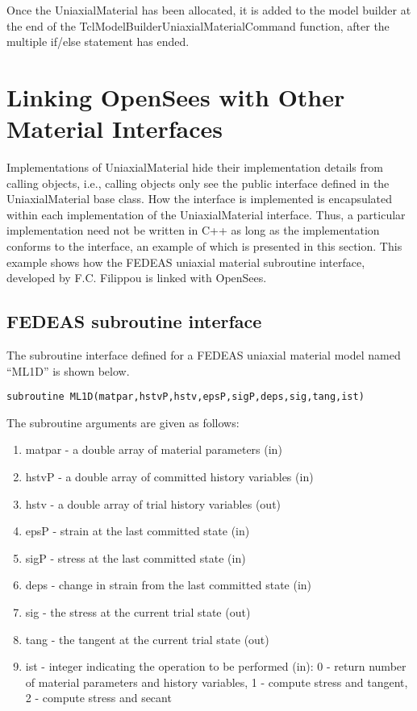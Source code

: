 \documentclass[12pt]{article}
\begin{document}
\noindent Once the UniaxialMaterial has been allocated, it is added to the model builder
at the end of the TclModelBuilderUniaxialMaterialCommand function, after the
multiple if/else statement has ended.

\section{Linking OpenSees with Other Material Interfaces}
Implementations of UniaxialMaterial hide their implementation details from calling
objects, i.e., calling objects only see the public interface defined in the UniaxialMaterial
base class. How the interface is implemented is encapsulated within each implementation
of the UniaxialMaterial interface. Thus, a particular implementation need not be written
in C++ as long as the implementation conforms to the interface, an example of which is
presented in this section. This example shows how the FEDEAS uniaxial material subroutine
interface, developed by F.C. Filippou is linked with OpenSees.

\subsection{FEDEAS subroutine interface}
The subroutine interface defined for a FEDEAS uniaxial material model named ``ML1D''
is shown below.

{\sf\small
\begin{verbatim}
subroutine ML1D(matpar,hstvP,hstv,epsP,sigP,deps,sig,tang,ist)
\end{verbatim}
}

\noindent The subroutine arguments are given as follows:

\begin{enumerate}
\item{matpar} - a double array of material parameters (in)
\item{hstvP} - a double array of committed history variables (in)
\item{hstv} - a double array of trial history variables (out)
\item{epsP} - strain at the last committed state (in)
\item{sigP} - stress at the last committed state (in)
\item{deps} - change in strain from the last committed state (in)
\item{sig} - the stress at the current trial state (out)
\item{tang} - the tangent at the current trial state (out)
\item{ist} - integer indicating the operation to be performed (in): 0 - return number
of material parameters and history variables, 1 - compute stress and tangent, 2 - compute 
stress and secant
\end{enumerate}
\end{document}
